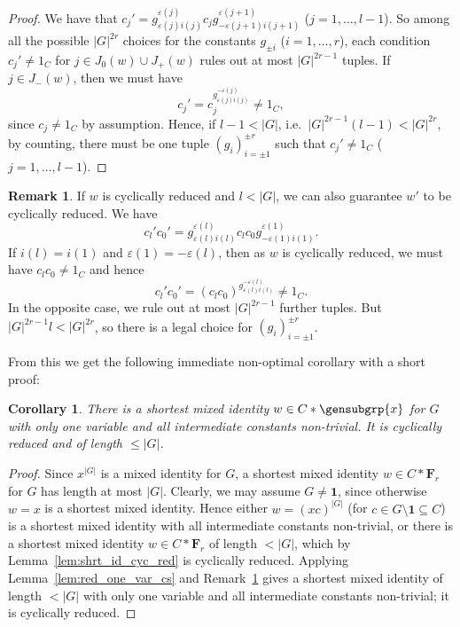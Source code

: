 \documentclass[a4paper,11pt]{amsproc}
\newcommand{\card}[1]{\left\lvert#1\right\rvert}%
\newcommand{\trivgrp}{\mathbf{1}}%
\newcommand{\freegrp}{\mathbf F}%
\theoremstyle{plain}
\newtheorem{corollary}[lemma]{Corollary}
\theoremstyle{definition}
\newtheorem{remark}[lemma]{Remark}
\begin{document}
	\begin{proof}
		We have that $c_j'=g_{\varepsilon(j) i(j)}^{\varepsilon(j)}c_j g_{-\varepsilon(j+1) i(j+1)}^{\varepsilon(j+1)}$ ($j=1,\ldots,l-1$). So among all the possible $\card{G}^{2r}$ choices for the constants $g_{\pm i}$ ($i=1,\ldots,r$), each condition $c_j'\neq 1_C$ for $j\in J_0(w)\cup J_+(w)$ rules out at most $\card{G}^{2r-1}$ tuples. If $j\in J_-(w)$, then we must have 
		$$
		c_j'=c_j^{g_{\varepsilon(j)i(j)}^{-\varepsilon(j)}}\neq 1_C,
		$$ since $c_j\neq 1_C$ by assumption. Hence, if $l-1<\card{G}$, i.e.\ $\card{G}^{2r-1}(l-1)<\card{G}^{2r}$, by counting, there must be one tuple $(g_i)_{i=\pm 1}^{\pm r}$ such that $c_j'\neq 1_C$ ($j=1,\ldots,l-1$).
	\end{proof}
	
	\begin{remark}\label{rem:cyc_red_cs}
		If $w$ is cyclically reduced and $l<\card{G}$, we can also guarantee $w'$ to be cyclically reduced. We have
		$$
		c_l'c_0'=g_{\varepsilon(l)i(l)}^{\varepsilon(l)}c_lc_0 g_{-\varepsilon(1)i(1)}^{\varepsilon(1)}.
		$$ 
		If $i(l)=i(1)$ and $\varepsilon(1)=-\varepsilon(l)$, then as $w$ is cyclically reduced, we must have $c_lc_0\neq 1_C$ and hence 
		$$
		c_l'c_0'=(c_lc_0)^{g_{\varepsilon(l)i(l)}^{-\varepsilon(l)}}\neq 1_C.
		$$
		In the opposite case, we rule out at most $\card{G}^{2r-1}$ further tuples. But $\card{G}^{2r-1}l<\card{G}^{2r}$, so there is a legal choice for $(g_i)_{i=\pm 1}^{\pm r}$.
	\end{remark}
	
	From this we get the following immediate non-optimal corollary with a short proof:
	
	\begin{corollary}\label{cor:shrt_id_one_var}
		There is a shortest mixed identity $w\in C\ast\gensubgrp{x}$ for $G$ with only one variable and all intermediate constants non-trivial. It is cyclically reduced and of length $\leq\card{G}$.
	\end{corollary}
	
	\begin{proof}
		Since $x^{\card{G}}$ is a mixed identity for $G$, a shortest mixed identity $w\in C\ast\freegrp_r$ for $G$ has length at most $\card{G}$. Clearly, we may assume $G\neq\trivgrp$, since otherwise $w=x$ is a shortest mixed identity. Hence either $w=(xc)^{\card{G}}$ (for $c\in G\setminus\trivgrp\subseteq C$) is a shortest mixed identity with all intermediate constants non-trivial, or there is a shortest mixed identity $w\in C\ast\freegrp_r$ of length $<\card{G}$, which by Lemma~\ref{lem:shrt_id_cyc_red} is cyclically reduced. Applying Lemma~\ref{lem:red_one_var_cs} and Remark~\ref{rem:cyc_red_cs} gives a shortest mixed identity of length $<\card{G}$ with only one variable and all intermediate constants non-trivial; it is cyclically reduced.
	\end{proof}
	
\end{document}
